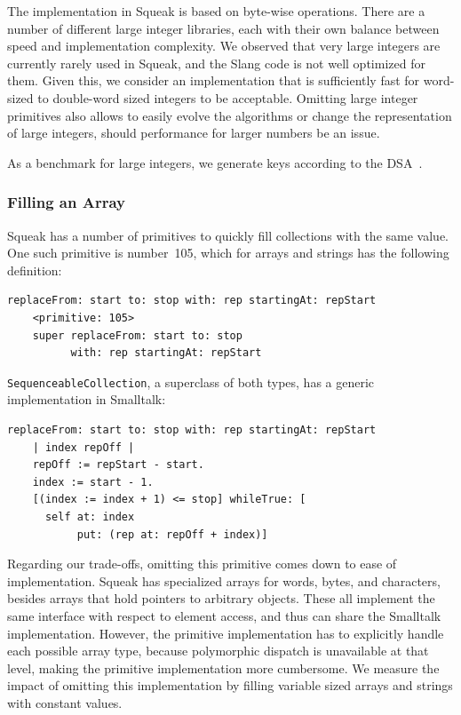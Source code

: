\documentclass[
10pt,          %
]{sigplanconf}
\begin{document}
The implementation in Squeak is based on byte-wise operations. There are a
number of different large integer libraries, each with their own balance
between speed and implementation complexity. We observed that very large
integers are currently rarely used in Squeak, and the Slang code is not well
optimized for them. Given this, we consider an implementation that is
sufficiently fast for word-sized to double-word sized integers to be
acceptable. Omitting large integer primitives also allows to easily evolve the
algorithms or change the representation of large integers, should performance
for larger numbers be an issue.

As a benchmark for large integers, we generate keys according to the
\acl{DSA}~\cite{NIST:2000:FPD}.

\subsubsection{Filling an Array}
Squeak has a number of primitives to quickly fill collections with the
same value. One such primitive is number~105, which for arrays and
strings has the following definition:
\begin{lstlisting}
replaceFrom: start to: stop with: rep startingAt: repStart 
    <primitive: 105>
    super replaceFrom: start to: stop
          with: rep startingAt: repStart
\end{lstlisting}

\verb!SequenceableCollection!, a superclass of both types, has a
generic implementation in Smalltalk:
\begin{lstlisting}
replaceFrom: start to: stop with: rep startingAt: repStart 
    | index repOff |
    repOff := repStart - start.
    index := start - 1.
    [(index := index + 1) <= stop] whileTrue: [
      self at: index
           put: (rep at: repOff + index)]
\end{lstlisting}

Regarding our trade-offs, omitting this primitive comes down to ease of
implementation. Squeak has specialized arrays for words, bytes, and characters,
besides arrays that hold pointers to arbitrary objects. These all implement the
same interface with respect to element access, and thus can share the Smalltalk
implementation. However, the primitive implementation has to explicitly handle
each possible array type, because polymorphic dispatch is unavailable at that
level, making the primitive implementation more cumbersome. We measure the
impact of omitting this implementation by filling variable sized arrays and
strings with constant values.
\end{document}
